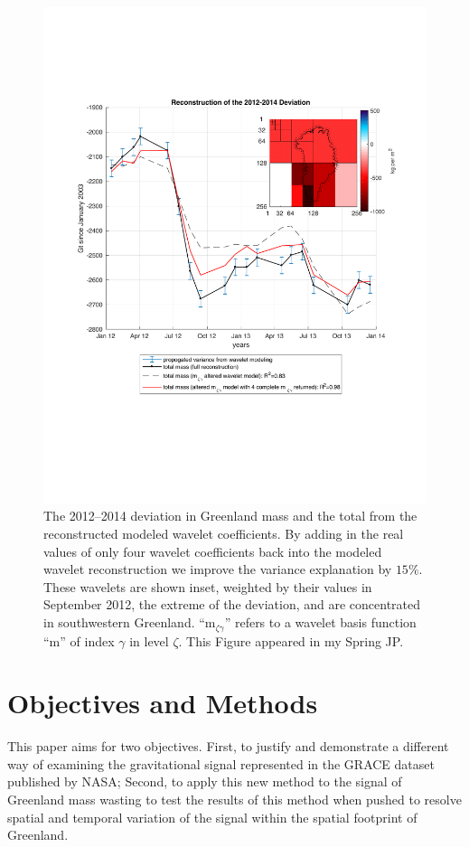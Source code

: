 \documentclass[12pt]{article}
\begin{document}
\begin{figure} 
\includegraphics[width=\linewidth]{Figures/deviant.pdf}
\caption[Location of the 2012--2014 Deviation]{The 2012--2014 deviation in Greenland mass and the total from the reconstructed modeled wavelet coefficients. By adding in the real values of only four wavelet coefficients back into the modeled wavelet reconstruction we improve the variance explanation by $15\%$. These wavelets are shown inset, weighted by their values in September 2012, the extreme of the deviation, and are concentrated in southwestern Greenland. ``m$_{\zeta\gamma}$'' refers to a wavelet basis function ``m'' of index $\gamma$ in level $\zeta$. This Figure appeared in my Spring JP.
\label{fig:deviant}}
\end{figure}

\section{Objectives and Methods \label{sec:methods}}
This paper aims for two objectives. First, to justify and demonstrate a different way of examining the gravitational signal represented in the GRACE dataset published by NASA; Second, to apply this new method to the signal of Greenland mass wasting to test the results of this method when pushed to resolve spatial and temporal variation of the signal within the spatial footprint of Greenland. 
\end{document}
